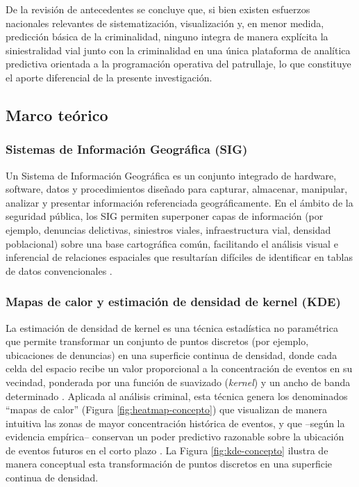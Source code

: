 \documentclass[12pt,letterpaper]{report}
\begin{document}
De la revisi\'on de antecedentes se concluye que, si bien existen esfuerzos nacionales relevantes de sistematizaci\'on, visualizaci\'on y, en menor medida, predicci\'on b\'asica de la criminalidad, ninguno integra de manera expl\'icita la siniestralidad vial junto con la criminalidad en una \'unica plataforma de analítica predictiva orientada a la programaci\'on operativa del patrullaje, lo que constituye el aporte diferencial de la presente investigaci\'on.

\subsection{Marco te\'orico}

\subsubsection{Sistemas de Informaci\'on Geogr\'afica (SIG)}
Un Sistema de Informaci\'on Geogr\'afica es un conjunto integrado de hardware, software, datos y procedimientos dise\~nado para capturar, almacenar, manipular, analizar y presentar informaci\'on referenciada geogr\'aficamente. En el \'ambito de la seguridad p\'ublica, los SIG permiten superponer capas de informaci\'on (por ejemplo, denuncias delictivas, siniestros viales, infraestructura vial, densidad poblacional) sobre una base cartogr\'afica com\'un, facilitando el an\'alisis visual e inferencial de relaciones espaciales que resultar\'ian dif\'iciles de identificar en tablas de datos convencionales \citep{eck2005mapping}.

\subsubsection{Mapas de calor y estimaci\'on de densidad de kernel (KDE)}
La estimaci\'on de densidad de kernel es una t\'ecnica estad\'istica no param\'etrica que permite transformar un conjunto de puntos discretos (por ejemplo, ubicaciones de denuncias) en una superficie continua de densidad, donde cada celda del espacio recibe un valor proporcional a la concentraci\'on de eventos en su vecindad, ponderada por una funci\'on de suavizado (\textit{kernel}) y un ancho de banda determinado \citep{silverman1986kde}. Aplicada al an\'alisis criminal, esta t\'ecnica genera los denominados ``mapas de calor'' (Figura \ref{fig:heatmap-concepto}) que visualizan de manera intuitiva las zonas de mayor concentraci\'on hist\'orica de eventos, y que --seg\'un la evidencia emp\'irica-- conservan un poder predictivo razonable sobre la ubicaci\'on de eventos futuros en el corto plazo \citep{chainey2008kde}. La Figura \ref{fig:kde-concepto} ilustra de manera conceptual esta transformaci\'on de puntos discretos en una superficie continua de densidad.
\end{document}
